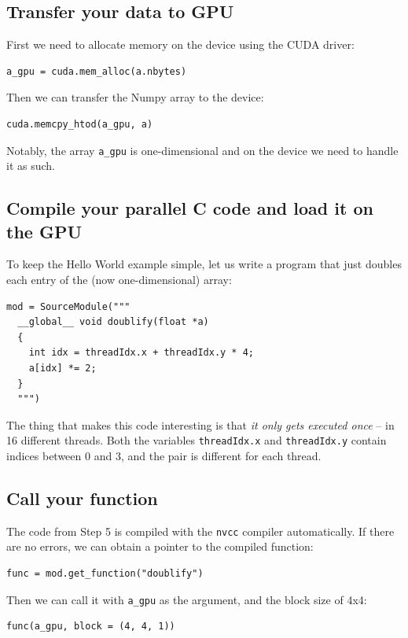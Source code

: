 \documentclass{article}
\begin{document}
\subsection{Transfer your data to GPU}

First we need to allocate memory on the device using the CUDA driver:
\begin{verbatim}
a_gpu = cuda.mem_alloc(a.nbytes)
\end{verbatim}
Then we can transfer the Numpy array to the device:

\begin{verbatim}
cuda.memcpy_htod(a_gpu, a)
\end{verbatim}
Notably, the array {\tt a\_gpu} is one-dimensional and on the device we need to 
handle it as such.

\subsection{Compile your parallel C code and load it on the GPU}

To keep the Hello World example simple, let us write a program that just doubles 
each entry of the (now one-dimensional) array:
\begin{verbatim}
mod = SourceModule("""
  __global__ void doublify(float *a)
  {
    int idx = threadIdx.x + threadIdx.y * 4;
    a[idx] *= 2;
  }
  """)
\end{verbatim}
The thing that makes this code interesting is that {\em it only gets executed
once} -- in 16 different threads. Both the variables {\tt threadIdx.x} and {\tt threadIdx.y}
contain indices between $0$ and $3$, and the pair is different for each thread. 

\subsection{Call your function}

The code from Step 5 is compiled with the {\tt nvcc} compiler automatically. 
If there are no errors, we can obtain a pointer to the compiled function:

\begin{verbatim}
func = mod.get_function("doublify")
\end{verbatim}
Then we can call it with {\tt a\_gpu} as the argument, and the block size of 4x4:

\begin{verbatim}
func(a_gpu, block = (4, 4, 1))
\end{verbatim}
\end{document}
